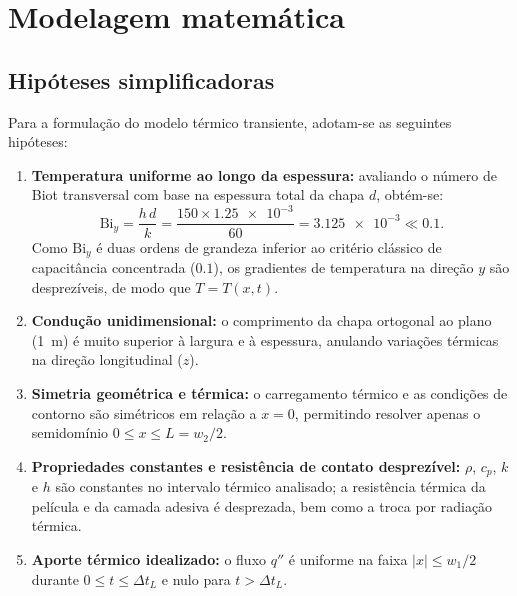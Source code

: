 \documentclass[11pt,a4paper]{article}
\begin{document}
\section{Modelagem matemática}

\subsection{Hipóteses simplificadoras}
Para a formulação do modelo térmico transiente, adotam-se as seguintes hipóteses:
\begin{enumerate}
    \item \textbf{Temperatura uniforme ao longo da espessura:} avaliando o número de Biot transversal com base na espessura total da chapa $d$, obtém-se:
    \begin{equation}
        \text{Bi}_y = \frac{h\,d}{k} = \frac{150 \times \num{1,25e-3}}{60} = \num{3,125e-3} \ll \num{0,1}.
        \label{eq:biy}
    \end{equation}
    Como $\text{Bi}_y$ é duas ordens de grandeza inferior ao critério clássico de capacitância concentrada ($\num{0,1}$), os gradientes de temperatura na direção $y$ são desprezíveis, de modo que $T = T(x,t)$.
    \item \textbf{Condução unidimensional:} o comprimento da chapa ortogonal ao plano (\SI{1}{m}) é muito superior à largura e à espessura, anulando variações térmicas na direção longitudinal ($z$).
    \item \textbf{Simetria geométrica e térmica:} o carregamento térmico e as condições de contorno são simétricos em relação a $x = 0$, permitindo resolver apenas o semidomínio $0 \le x \le L = w_2/2$.
    \item \textbf{Propriedades constantes e resistência de contato desprezível:} $\rho$, $c_p$, $k$ e $h$ são constantes no intervalo térmico analisado; a resistência térmica da película e da camada adesiva é desprezada, bem como a troca por radiação térmica.
    \item \textbf{Aporte térmico idealizado:} o fluxo $q''$ é uniforme na faixa $|x| \le w_1/2$ durante $0 \le t \le \Delta t_L$ e nulo para $t > \Delta t_L$.
\end{enumerate}
\end{document}

